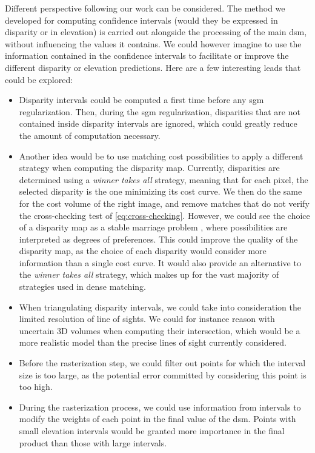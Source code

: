 Different perspective following our work can be considered. The method we developed for computing confidence intervals (would they be expressed in disparity or in elevation) is carried out alongside the processing of the main \acrshort{dsm}, without influencing the values it contains. We could however imagine to use the information contained in the confidence intervals to facilitate or improve the different disparity or elevation predictions. Here are a few interesting leads that could be explored:
\begin{itemize}
    \item Disparity intervals could be computed a first time before any \acrshort{sgm} regularization. Then, during the \acrshort{sgm} regularization, disparities that are not contained inside disparity intervals are ignored, which could greatly reduce the amount of computation necessary. 
    \item Another idea would be to use matching cost possibilities to apply a different strategy when computing the disparity map. Currently, disparities are determined using a \textit{winner takes all} strategy, meaning that for each pixel, the selected disparity is the one minimizing its cost curve. We then do the same for the cost volume of the right image, and remove matches that do not verify the cross-checking test of \cref{eq:cross-checking}. However, we could see the choice of a disparity map as a stable marriage problem \cite{irving_matching_1998}, where possibilities are interpreted as degrees of preferences. This could improve the quality of the disparity map, as the choice of each disparity would consider more information than a single cost curve. It would also provide an alternative to the \textit{winner takes all} strategy, which makes up for the vast majority of strategies used in dense matching.  
    \item When triangulating disparity intervals, we could take into consideration the limited resolution of line of sights. We could for instance reason with uncertain 3D volumes when computing their intersection, which would be a more realistic model than the precise lines of sight currently considered.
    \item Before the rasterization step, we could filter out points for which the interval size is too large, as the potential error committed by considering this point is too high. 
    \item During the rasterization process, we could use information from intervals to modify the weights of each point in the final value of the \acrshort{dsm}. Points with small elevation intervals would be granted more importance in the final product than those with large intervals. 
\end{itemize}
